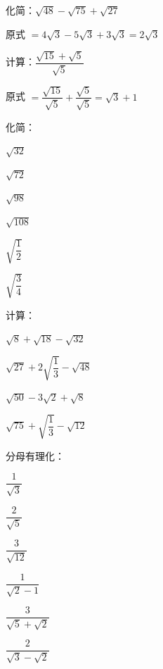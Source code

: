 \documentclass[a4paper,12pt]{ctexart}
\begin{document}

\begin{example}
化简：$\sqrt{48}-\sqrt{75}+\sqrt{27}$
\end{example}
\begin{solution}
原式 $=4\sqrt3-5\sqrt3+3\sqrt3=2\sqrt3$
\end{solution}

\begin{example}
计算：$\dfrac{\sqrt{15}+\sqrt{5}}{\sqrt5}$
\end{example}
\begin{solution}
原式 $=\dfrac{\sqrt{15}}{\sqrt5}+\dfrac{\sqrt5}{\sqrt5}=\sqrt3+1$
\end{solution}


\begin{exercise}
\item 化简：
  \begin{subexercise}
    \item $\sqrt{32}$
    \item $\sqrt{72}$
    \item $\sqrt{98}$
    \item $\sqrt{108}$
    \item $\sqrt{\dfrac{1}{2}}$
    \item $\sqrt{\dfrac{3}{4}}$
  \end{subexercise}

\item 计算：
  \begin{subexercise}
    \item $\sqrt{8}+\sqrt{18}-\sqrt{32}$
    \item $\sqrt{27}+2\sqrt{\dfrac{1}{3}}-\sqrt{48}$
    \item $\sqrt{50}-3\sqrt{2}+\sqrt{8}$
    \item $\sqrt{75}+\sqrt{\dfrac{1}{3}}-\sqrt{12}$
  \end{subexercise}

\item 分母有理化：
  \begin{subexercise}
    \item $\dfrac{1}{\sqrt3}$
    \item $\dfrac{2}{\sqrt5}$
    \item $\dfrac{3}{\sqrt{12}}$
    \item $\dfrac{1}{\sqrt2-1}$
    \item $\dfrac{3}{\sqrt5+\sqrt2}$
    \item $\dfrac{2}{\sqrt3-\sqrt2}$
  \end{subexercise}
\end{exercise}
\end{document}
